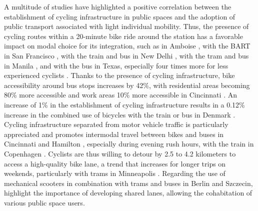 \begin{refsegment}
A multitude of studies have highlighted a positive correlation between the establishment of cycling infrastructure in public spaces and the adoption of public transport associated with light individual mobility. Thus, the presence of cycling routes within a 20-minute bike ride around the station has a favorable impact on modal choice for its integration, such as in Amboise \textcolor{blue}{\autocite[751]{midenet_modal_2018}}, with the \acrfull{BART} in San Francisco \textcolor{blue}{\autocite[93]{cervero_bike-and-ride_2013}}, with the train and bus in New Delhi \textcolor{blue}{\autocite[38]{mohanty_effect_2017}}, with the tram and bus in Manila \textcolor{blue}{\autocite[250]{fillone_i_2018}}, and with the bus in Texas, especially four times more for less experienced cyclists \textcolor{blue}{\autocite[91]{taylor_analysis_1996}}. Thanks to the presence of cycling infrastructure, bike accessibility around bus stops increases by 42\%, with residential areas becoming 80\% more accessible and work areas 10\% more accessible in Cincinnati \textcolor{blue}{\autocite[8]{zuo_determining_2018}}. An increase of 1\% in the establishment of cycling infrastructure results in a 0.12\% increase in the combined use of bicycles with the train or bus in Denmark \textcolor{blue}{\autocite[42]{nielsen_bikeability_2018}}. Cycling infrastructure separated from motor vehicle traffic is particularly appreciated and promotes intermodal travel between bikes and buses in Cincinnati \textcolor{blue}{\autocite[67]{zuo_bikeway_2019}} and Hamilton \textcolor{blue}{\autocite[87]{zuo_incorporating_2021}}, especially during evening rush hours, with the train in Copenhagen \textcolor{blue}{\autocite[19]{halldorsdottir_home-end_2017}}. Cyclists are thus willing to detour by 2.5 to 4.2 kilometers to access a high-quality bike lane, a trend that increases for longer trips on weekends, particularly with trams in Minneapolis \textcolor{blue}{\autocite[616]{krizek_detailed_2007}}. Regarding the use of mechanical scooters in combination with trams and buses in Berlin and Szczecin, \textcolor{blue}{\textcite[7]{kostrzewska_towards_2017}} highlight the importance of developing shared lanes, allowing the cohabitation of various public space users.%


\end{refsegment}
